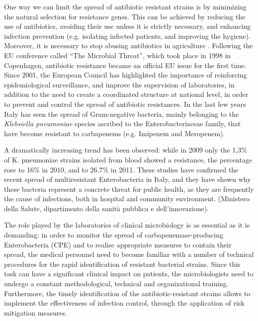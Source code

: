 \documentclass[11pt]{report}
\begin{document}
One way we can limit the spread of antibiotic resistant strains is by minimizing the natural selection for resistance genes.
This can be achieved by reducing the use of antibiotics, avoiding their use unless it is strictly necessary, and enhancing infection prevention (e.g. isolating infected patients, and improving the hygiene). Moreover, it is necessary to stop abusing antibiotics in agriculture \cite{Spellberg2014} \cite{doi:10.1093/emph/eou024}.
Following the EU conference called “The Microbial Threat”, which took place in 1998 in Copenhagen, antibiotic resistance became an official EU issue for the first time. Since 2001, the European Council has highlighted the importance of reinforcing epidemiological surveillance, and improve the supervision of laboratories, in addition to the need to create a  coordinated structure at national level, in order to prevent and control the spread of antibiotic resistances.
In the last few years Italy has seen the spread of Gram-negative bacteria, mainly belonging to the \emph{Klebsiella pneumoniae} species ascribed to the Enterobacteriaceae family, that have become resistant to carbapenems (e.g. Imipenem and Meropenem).

A dramatically increasing trend has been observed: while in 2009 only the 1,3$\%$ of K. pneumoniae strains isolated from blood showed a resistance, the percentage rose to 16$\%$ in 2010, and to 26.7$\%$ in 2011.
These studies have confirmed the recent spread of multiresistant Enterobacteria in Italy, and they have shown why these bacteria represent a concrete threat for public health, as they are frequently the cause of infections, both in hospital and community environment.
(Ministero della Salute, dipartimento della sanità pubblica e dell’innovazione).

The role played by the laboratories of clinical microbiology is as essential as it is demanding: in order to monitor the spread of carbapenemase-producing Enterobacteria (CPE) and to realise appropriate measures to contain their spread, the medical personnel need to become familiar with a number of technical procedures for the rapid identification of resistant bacterial strains. Since this task can have a significant clinical impact on patients, the microbiologists need to undergo a constant methodological, technical and organizational training. Furthermore, the timely identification of the antibiotic-resistant strains allows to implement the effectiveness of infection control, through the application of risk mitigation measures.
\end{document}
